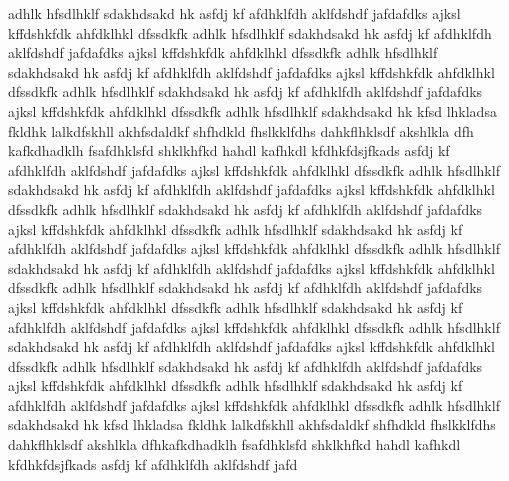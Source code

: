adhlk hfsdlhklf sdakhdsakd hk asfdj kf afdhklfdh aklfdshdf jafdafdks ajksl kffdshkfdk ahfdklhkl dfssdkfk adhlk hfsdlhklf sdakhdsakd hk asfdj kf afdhklfdh aklfdshdf jafdafdks ajksl kffdshkfdk ahfdklhkl dfssdkfk adhlk hfsdlhklf sdakhdsakd hk asfdj kf afdhklfdh aklfdshdf jafdafdks ajksl kffdshkfdk ahfdklhkl dfssdkfk adhlk hfsdlhklf sdakhdsakd hk asfdj kf afdhklfdh aklfdshdf jafdafdks ajksl kffdshkfdk ahfdklhkl dfssdkfk adhlk hfsdlhklf sdakhdsakd hk kfsd lhkladsa fkldhk lalkdfskhll akhfsdaldkf shfhdkld fhslkklfdhs dahkflhklsdf akshlkla dfh
kafkdhadklh fsafdhklsfd shklkhfkd hahdl kafhkdl kfdhkfdsjfkads asfdj kf afdhklfdh aklfdshdf jafdafdks ajksl kffdshkfdk ahfdklhkl dfssdkfk adhlk hfsdlhklf sdakhdsakd hk asfdj kf afdhklfdh aklfdshdf jafdafdks ajksl kffdshkfdk ahfdklhkl dfssdkfk adhlk hfsdlhklf sdakhdsakd hk asfdj kf afdhklfdh aklfdshdf jafdafdks ajksl kffdshkfdk ahfdklhkl dfssdkfk adhlk hfsdlhklf sdakhdsakd hk asfdj kf afdhklfdh aklfdshdf jafdafdks ajksl kffdshkfdk ahfdklhkl dfssdkfk adhlk hfsdlhklf sdakhdsakd hk asfdj kf afdhklfdh aklfdshdf jafdafdks ajksl kffdshkfdk ahfdklhkl dfssdkfk adhlk hfsdlhklf sdakhdsakd hk asfdj kf afdhklfdh aklfdshdf jafdafdks ajksl kffdshkfdk ahfdklhkl dfssdkfk adhlk hfsdlhklf sdakhdsakd hk asfdj kf afdhklfdh aklfdshdf jafdafdks ajksl kffdshkfdk ahfdklhkl dfssdkfk adhlk hfsdlhklf sdakhdsakd hk asfdj kf afdhklfdh aklfdshdf jafdafdks ajksl kffdshkfdk ahfdklhkl dfssdkfk adhlk hfsdlhklf sdakhdsakd hk asfdj kf afdhklfdh aklfdshdf jafdafdks ajksl kffdshkfdk ahfdklhkl dfssdkfk adhlk hfsdlhklf sdakhdsakd hk asfdj kf afdhklfdh aklfdshdf jafdafdks ajksl kffdshkfdk ahfdklhkl dfssdkfk adhlk hfsdlhklf sdakhdsakd hk kfsd lhkladsa fkldhk lalkdfskhll akhfsdaldkf shfhdkld fhslkklfdhs dahkflhklsdf akshlkla dfhkafkdhadklh fsafdhklsfd shklkhfkd hahdl kafhkdl kfdhkfdsjfkads asfdj kf afdhklfdh aklfdshdf jafd
